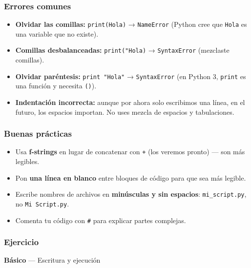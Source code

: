 \documentclass[
  doc,
  floatsintext,
  longtable,
  a4paper,
  nolmodern,
  notxfonts,
  notimes,
  12pt,
  colorlinks=true,linkcolor=blue,citecolor=blue,urlcolor=blue]{apa7}
\providecommand{\tightlist}{%
  \setlength{\itemsep}{0pt}\setlength{\parskip}{0pt}}
\begin{document}
\subsubsection{Errores comunes}\label{errores-comunes}

\begin{itemize}
\tightlist
\item
  \textbf{Olvidar las comillas:} \texttt{print(Hola)} →
  \texttt{NameError} (Python cree que \texttt{Hola} es una variable que
  no existe).
\item
  \textbf{Comillas desbalanceadas:}
  \texttt{print("Hola\textquotesingle{})} → \texttt{SyntaxError}
  (mezclaste comillas).
\item
  \textbf{Olvidar paréntesis:} \texttt{print\ "Hola"} →
  \texttt{SyntaxError} (en Python 3, \texttt{print} es una función y
  necesita \texttt{()}).
\item
  \textbf{Indentación incorrecta:} aunque por ahora solo escribimos una
  línea, en el futuro, los espacios importan. No uses mezcla de espacios
  y tabulaciones.
\end{itemize}

\subsubsection{Buenas prácticas}\label{buenas-pruxe1cticas}

\begin{itemize}
\tightlist
\item
  Usa \textbf{f-strings} en lugar de concatenar con \texttt{+} (los
  veremos pronto) --- son más legibles.
\item
  Pon \textbf{una línea en blanco} entre bloques de código para que sea
  más legible.
\item
  Escribe nombres de archivos en \textbf{minúsculas y sin espacios}:
  \texttt{mi\_script.py}, no \texttt{Mi\ Script.py}.
\item
  Comenta tu código con \texttt{\#} para explicar partes complejas.
\end{itemize}

\subsubsection{Ejercicio}\label{ejercicio}

\textbf{Básico} --- Escritura y ejecución
\end{document}
